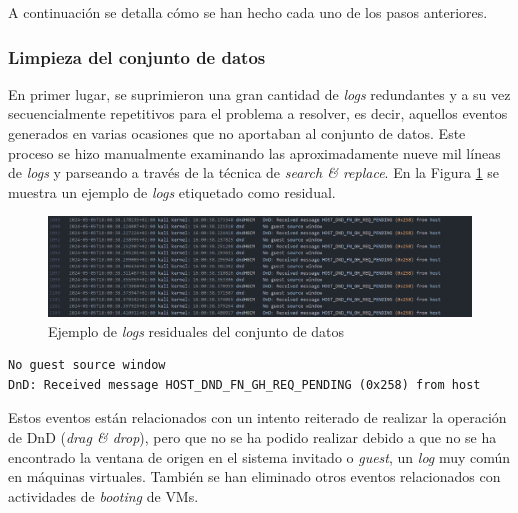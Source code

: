 A continuación se detalla cómo se han hecho cada uno de los pasos anteriores.

\vspace{-3mm}

\subsubsection*{Limpieza del conjunto de datos} %

En primer lugar, se suprimieron una gran cantidad de \textit{logs} redundantes y a su vez secuencialmente repetitivos para el problema a resolver, es decir, aquellos eventos generados en varias ocasiones que no aportaban al conjunto de datos. Este proceso se hizo manualmente examinando las aproximadamente nueve mil líneas de \textit{logs} y parseando a través de la técnica de \textit{search \& replace}. En la Figura \ref{fig:residual-logs} se muestra un ejemplo de \textit{logs} etiquetado como residual.

\vspace{-1mm}

\begin{figure}[H]
    \centering
    \includegraphics[width=1\linewidth]{imagenes/logs-residuales.png}
    \caption{Ejemplo de \textit{logs} residuales del conjunto de datos}
    \label{fig:residual-logs}
\end{figure}

\vspace{-5mm}

\begin{center}
\begin{mdframed}
\footnotesize
    \begin{verbatim}
No guest source window
DnD: Received message HOST_DND_FN_GH_REQ_PENDING (0x258) from host
    \end{verbatim}
\end{mdframed}
\end{center}

\vspace{-2mm}

Estos eventos están relacionados con un intento reiterado de realizar la operación de \gls{DnD} (\textit{drag \& drop}), pero que no se ha podido realizar debido a que no se ha encontrado la ventana de origen en el sistema invitado o \textit{guest}, un \textit{log} muy común en máquinas virtuales. También se han eliminado otros eventos relacionados con actividades de \textit{booting} de \gls{VM}s.

